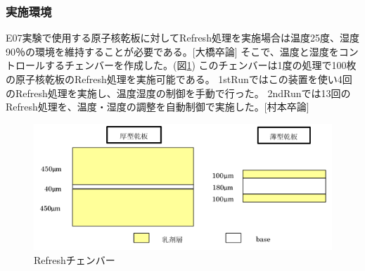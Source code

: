 \documentclass[12pt,a4paper]{jarticle}
\begin{document}
\subsubsection{実施環境}
E07実験で使用する原子核乾板に対してRefresh処理を実施場合は温度25度、湿度90％の環境を維持することが必要である。[大橋卒論]
そこで、温度と湿度をコントロールするチェンバーを作成した。(図\ref{fig:refresh_masi-nn})
このチェンバーは1度の処理で100枚の原子核乾板のRefresh処理を実施可能である。
1stRunではこの装置を使い4回のRefresh処理を実施し、温度湿度の制御を手動で行った。
2ndRunでは13回のRefresh処理を、温度・湿度の調整を自動制御で実施した。[村本卒論]
\begin{figure}[htbp]
  \centering
     \includegraphics[width=140mm]{emulsionorder.png}
  \caption{Refreshチェンバー\label{fig:refresh_masi-nn}}
\end{figure}
\end{document}
